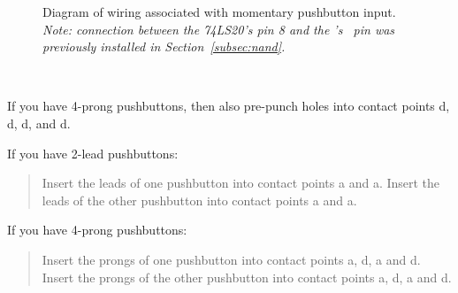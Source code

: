 \begin{figure}
    \centering
    \hfil
    \caption{Diagram of wiring associated with momentary pushbutton input.
        \textit{Note: connection between the 74LS20's pin 8 and the \developmentboard's
        \mcubuttonnand\ pin was previously installed in Section~\ref{subsec:nand}.}
        \label{fig:pushbutton-diagram}}
\end{figure}

\disconnect\

If you have 4-prong pushbuttons, then also pre-punch holes into contact points d, d, d, and d.

If you have 2-lead pushbuttons:
\begin{quote}
    Insert the leads of one pushbutton into contact points a and a.
    Insert the leads of the other pushbutton into contact points a and a.
\end{quote}

If you have 4-prong pushbuttons:
\begin{quote}
    Insert the prongs of one pushbutton into contact points a, d, a and d.
    Insert the prongs of the other pushbutton into contact points a, d, a and d.
\end{quote}

